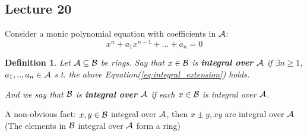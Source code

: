 \documentclass[11pt]{article}
\newtheorem{dfn}[thm]{Definition}
\newcommand{\cala}{{\cal A}}
\newcommand{\calb}{{\cal B}}
\begin{document}
\subsection{Lecture 20}
Consider a monic polynomial equation with coefficients in $\cala$:
\begin{equation}\label{eq:integral_extension}\tag{*}
x^n+a_1 x^{n-1}+...+a_n=0
\end{equation}
\begin{dfn}
Let $\cala\subseteq \calb$ be rings. Say that $x\in\calb$ is \textbf{integral over $\cala$} if $\exists n\geq 1$, $a_1,..,a_{n}\in\cala$ s.t. the above Equation(\ref{eq:integral_extension}) holds.

And we say that $\calb$ is \textbf{integral over $\cala$} if each $x\in\calb$ is integral over $\cala$.
\end{dfn}

A non-obvious fact: $x,y\in \calb$ integral over $\cala$, then $x\pm y, xy$ are integral over $\cala$ (The elements in $\calb$ integral over $\cala$ form a ring)
\end{document}
